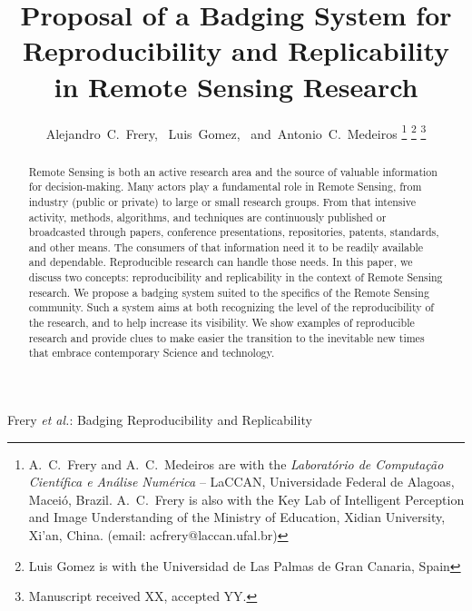 \documentclass[journal,twoside]{IEEEtran}
\begin{document}
	
\title{Proposal of a Badging System for Reproducibility and Replicability in Remote Sensing Research}
	
\author{Alejandro~C.~Frery,~
	Luis~Gomez,~
	and~Antonio~C.~Medeiros%
	\thanks{A.\ C.\ Frery and A.\ C.\ Medeiros are with the \textit{Laborat\'orio de Computa\c c\~ao Cient\'ifica e An\'alise Num\'erica} -- LaCCAN, Universidade Federal de Alagoas, Macei\'o, Brazil.
		A.\ C.\ Frery is also with the Key Lab of Intelligent Perception and Image Understanding of the Ministry of Education, Xidian University, Xi'an, China. (email: acfrery@laccan.ufal.br)}%
	\thanks{Luis Gomez is with the Universidad de Las Palmas de Gran Canaria, Spain}%
	\thanks{Manuscript received XX, accepted YY.}}

%
{Frery \MakeLowercase{\textit{et al.}}: Badging Reproducibility and Replicability}

\maketitle
\begin{abstract}
	Remote Sensing is both an active research area and the source of valuable information for decision-making.
	Many actors play a fundamental role in Remote Sensing, from industry (public or private) to large or small research groups. 
	From that intensive activity, methods, algorithms, and techniques are continuously published or broadcasted through papers, conference presentations, repositories, patents, standards, and other means.     
	The consumers of that information need it to be readily available and dependable. 
	Reproducible research can handle those needs.
	In this paper, we discuss two concepts: reproducibility and replicability in the context of Remote Sensing research. 
	We propose a badging system suited to the specifics of the Remote Sensing community.
	Such a system aims at both recognizing the level of the reproducibility of the research, and to help increase its visibility. 
	We show examples of reproducible research and provide clues to make easier the transition to the inevitable new times that embrace contemporary Science and technology. 
\end{abstract}
\end{document}
